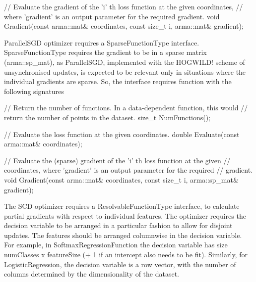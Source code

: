\begin{DoxyCode}
\textcolor{comment}{// Evaluate the gradient of the 'i' th loss function at the given coordinates,}
\textcolor{comment}{// where 'gradient' is an output parameter for the required gradient.}
\textcolor{keywordtype}{void} Gradient(\textcolor{keyword}{const} arma::mat& coordinates, \textcolor{keyword}{const} \textcolor{keywordtype}{size\_t} i, arma::mat& gradient);
\end{DoxyCode}


{\ttfamily Parallel\+S\+GD} optimizer requires a {\ttfamily Sparse\+Function\+Type} interface. {\ttfamily Sparse\+Function\+Type} requires the gradient to be in a sparse matrix ({\ttfamily arma\+::sp\+\_\+mat}), as Parallel\+S\+GD, implemented with the H\+O\+G\+W\+I\+L\+D! scheme of unsynchronised updates, is expected to be relevant only in situations where the individual gradients are sparse. So, the interface requires function with the following signatures


\begin{DoxyCode}
\textcolor{comment}{// Return the number of functions. In a data-dependent function, this would}
\textcolor{comment}{// return the number of points in the dataset.}
\textcolor{keywordtype}{size\_t} NumFunctions();
\end{DoxyCode}



\begin{DoxyCode}
\textcolor{comment}{// Evaluate the loss function at the given coordinates.}
\textcolor{keywordtype}{double} Evaluate(\textcolor{keyword}{const} arma::mat& coordinates);
\end{DoxyCode}



\begin{DoxyCode}
\textcolor{comment}{// Evaluate the (sparse) gradient of the 'i' th loss function at the given}
\textcolor{comment}{// coordinates, where 'gradient' is an output parameter for the required}
\textcolor{comment}{// gradient.}
\textcolor{keywordtype}{void} Gradient(\textcolor{keyword}{const} arma::mat& coordinates, \textcolor{keyword}{const} \textcolor{keywordtype}{size\_t} i, arma::sp\_mat& gradient);
\end{DoxyCode}


The {\ttfamily S\+CD} optimizer requires a {\ttfamily Resolvable\+Function\+Type} interface, to calculate partial gradients with respect to individual features. The optimizer requires the decision variable to be arranged in a particular fashion to allow for disjoint updates. The features should be arranged columnwise in the decision variable. For example, in {\ttfamily Softmax\+Regression\+Function} the decision variable has size {\ttfamily num\+Classes} x {\ttfamily feature\+Size} (+ 1 if an intercept also needs to be fit). Similarly, for {\ttfamily Logistic\+Regression}, the decision variable is a row vector, with the number of columns determined by the dimensionality of the dataset.

